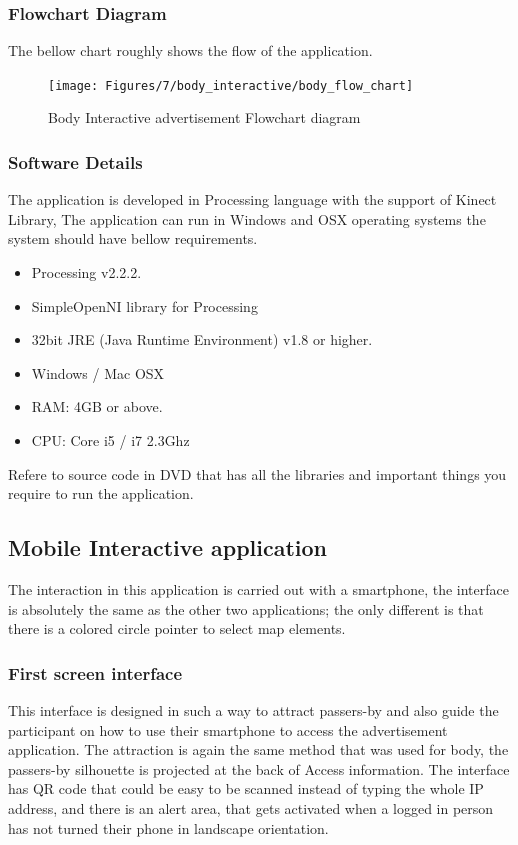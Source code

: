 \subsubsection{Flowchart Diagram}
The bellow chart roughly shows the flow of the application.
\begin{figure}[H]
    \centering
    \texttt{[image: Figures/7/body\_interactive/body\_flow\_chart]}
    \caption{Body Interactive advertisement Flowchart diagram}%
    \label{fig:Body_flowchat}%
\end{figure}


\subsubsection{Software Details}
The application is developed in Processing language with the support of Kinect Library, The application can run in Windows and OSX operating systems the system should have bellow requirements.

\begin{itemize}
\item Processing v2.2.2.
\item SimpleOpenNI library for Processing \cite{simpleopenni}
\item 32bit JRE (Java Runtime Environment) v1.8 or higher.
\item Windows / Mac OSX
\item RAM: 4GB or above.
\item CPU: Core i5 / i7 2.3Ghz
\end{itemize}

Refere to source code in DVD that has all the libraries and important things you require to run the application.


\subsection{Mobile Interactive application}
The interaction in this application is carried out with a smartphone, the interface is absolutely the same as the other two applications; the only different is that there is a colored circle pointer to select map elements.


\subsubsection{First screen interface}
This interface is designed in such a way to attract passers-by and also guide the participant on how to use their smartphone to access the advertisement application. The attraction is again the same method that was used for body, the passers-by silhouette is projected at the back of Access information. The interface has QR code that could be easy to be scanned instead of typing the whole IP address, and there is an alert area, that gets activated when a logged in person has not turned their phone in landscape orientation.

